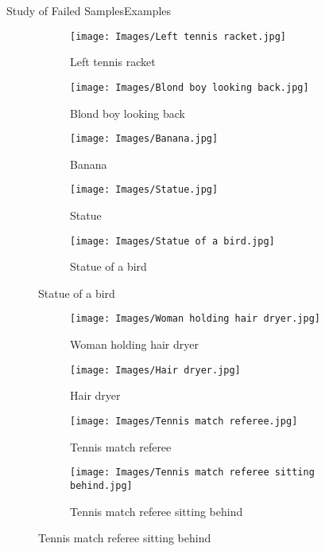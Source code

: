 \documentclass{beamer}
\begin{document}
\begin{frame}{Study of Failed Samples}{Examples}
  \vspace*{-.75cm}
  \begin{figure}
    \begin{subfigure}[t]{.32\textwidth}
      \centering
      \caption{Left tennis racket}
      \texttt{[image: Images/Left tennis racket.jpg]}
    \end{subfigure}\hfill
    \begin{subfigure}[t]{.32\textwidth}
      \centering
      \caption{Blond boy looking back}
      \texttt{[image: Images/Blond boy looking back.jpg]}
    \end{subfigure}\hfill
    \begin{subfigure}[t]{.32\textwidth}
      \centering
      \caption{Banana}
      \texttt{[image: Images/Banana.jpg]}
    \end{subfigure}

    \bigskip
    \begin{subfigure}[t]{.4\textwidth}
      \centering
      \caption{Statue}
      \texttt{[image: Images/Statue.jpg]}
    \end{subfigure}\hspace{.06\textwidth}
    \begin{subfigure}[t]{.4\textwidth}
      \centering
      \caption{Statue of a bird}
      \texttt{[image: Images/Statue of a bird.jpg]}
    \end{subfigure}
  \end{figure}
\end{frame}

\begin{frame}[plain]
  \vspace*{-.75cm}
  \begin{figure}
    \begin{subfigure}[t]{.32\textwidth}
      \centering
      \caption{Woman holding hair dryer}
      \texttt{[image: Images/Woman holding hair dryer.jpg]}
    \end{subfigure}\hspace{.1\textwidth}
    \begin{subfigure}[t]{.32\textwidth}
      \centering
      \caption{Hair dryer}
      \texttt{[image: Images/Hair dryer.jpg]}
    \end{subfigure}

    \bigskip
    \begin{subfigure}[t]{.45\textwidth}
      \centering
      \caption{Tennis match referee}
      \texttt{[image: Images/Tennis match referee.jpg]}
    \end{subfigure}\hspace{.05\textwidth}
    \begin{subfigure}[t]{.45\textwidth}
      \centering
      \caption{Tennis match referee sitting behind}
      \texttt{[image: Images/Tennis match referee sitting behind.jpg]}
    \end{subfigure}
  \end{figure}
\end{frame}
\end{document}
